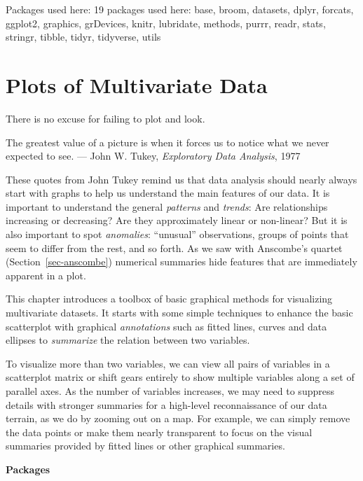 \documentclass[
  letterpaper,
  10pt,
  krantz2]{krantz}
\renewenvironment{quote}{\begin{VF}}{\end{VF}}
\begin{document}
Packages used here: 19 packages used here: base, broom, datasets, dplyr,
forcats, ggplot2, graphics, grDevices, knitr, lubridate, methods, purrr,
readr, stats, stringr, tibble, tidyr, tidyverse, utils


\hypertarget{sec-multivariate_plots}{%
\chapter{Plots of Multivariate Data}\label{sec-multivariate_plots}}

\begin{quote}
There is no excuse for failing to plot and look.

The greatest value of a picture is when it forces us to notice what we
never expected to see. --- John W. Tukey, \emph{Exploratory Data
Analysis}, 1977
\end{quote}

These quotes from John Tukey remind us that data analysis should nearly
always start with graphs to help us understand the main features of our
data. It is important to understand the general \emph{patterns} and
\emph{trends}: Are relationships increasing or decreasing? Are they
approximately linear or non-linear? But it is also important to spot
\emph{anomalies}: ``unusual'' observations, groups of points that seem
to differ from the rest, and so forth. As we saw with Anscombe's quartet
(Section~\ref{sec-anscombe}) numerical summaries hide features that are
immediately apparent in a plot.

This chapter introduces a toolbox of basic graphical methods for
visualizing multivariate datasets. It starts with some simple techniques
to enhance the basic scatterplot with graphical \emph{annotations} such
as fitted lines, curves and data ellipses to \emph{summarize} the
relation between two variables.

To visualize more than two variables, we can view all pairs of variables
in a scatterplot matrix or shift gears entirely to show multiple
variables along a set of parallel axes. As the number of variables
increases, we may need to suppress details with stronger summaries for a
high-level reconnaissance of our data terrain, as we do by zooming out
on a map. For example, we can simply remove the data points or make them
nearly transparent to focus on the visual summaries provided by fitted
lines or other graphical summaries.

\textbf{Packages}
\end{document}
